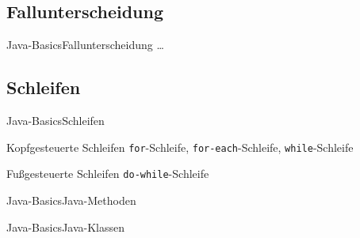 \subsection{Fallunterscheidung}
\begin{frame}{Java-Basics}{Fallunterscheidung}
    \ldots
\end{frame}


\subsection{Schleifen}
\begin{frame}{Java-Basics}{Schleifen}
    \begin{block}{Kopfgesteuerte Schleifen}
        \texttt{for}-Schleife, \texttt{for-each}-Schleife, \texttt{while}-Schleife
    \end{block}
    \begin{block}{Fu\ss gesteuerte Schleifen}
        \texttt{do-while}-Schleife
    \end{block}
\end{frame}

%
%
\begin{frame}{Java-Basics}{Java-Methoden}
\end{frame}

\begin{frame}{Java-Basics}{Java-Klassen}
\end{frame}